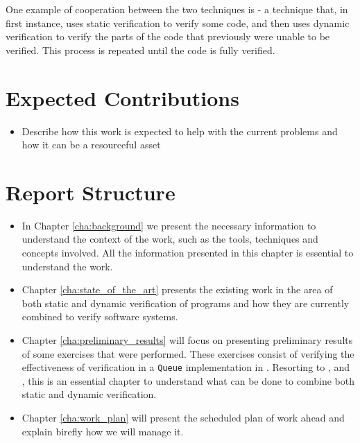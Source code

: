 One example of cooperation between the two techniques is \monitors - a technique that, 
in first instance, uses static verification to verify some code, and then uses dynamic verification 
to verify the parts of the code that previously were unable to be verified. This process is repeated until 
the code is fully verified.

\section{Expected Contributions}
\label{sec:expected_Contributions}

\begin{itemize}
    \item Describe how this work is expected to help with the current problems
    and how it can be a resourceful asset
\end{itemize}

\section{Report Structure}
\label{sec:report_structure}

\begin{itemize}
    \item In Chapter \ref{cha:background} we present the necessary information to understand
        the context of the work, such as the tools, techniques and concepts involved. All 
        the information presented in this chapter is essential to understand the work.
    \item Chapter \ref{cha:state_of_the_art} presents the existing work in the area of 
        both static and dynamic verification of \ocaml programs and how they are currently 
        combined to verify software systems.
    \item Chapter \ref{cha:preliminary_results} will focus on presenting preliminary 
        results of some exercises that were performed. These exercises consist of verifying 
        the effectiveness of verification in a \texttt{Queue} implementation in \ocaml. 
        Resorting to \gospellang, \cameleer and \ortac, this is an essential chapter to understand 
        what can be done to combine both static and dynamic verification.
    \item Chapter \ref{cha:work_plan} will present the scheduled plan of work ahead and explain 
    birefly how we will manage it.
\end{itemize}